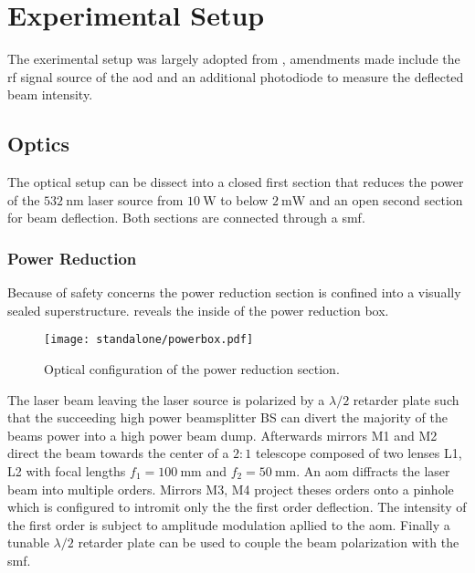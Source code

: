 \chapter{Experimental Setup}

The exerimental setup was largely adopted from \cite{Hertlein2017}, amendments
made include the \gls{rf} signal source of the \gls{aod} and an additional
photodiode to measure the deflected beam intensity.

\section{Optics}

The optical setup can be dissect into a closed first section that reduces
the power of the $\SI{532}{\nano\meter}$ laser source from $\SI{10}{\watt}$
to below $\SI{2}{\milli\watt}$ and an open second section for beam deflection.
Both sections are connected through a \gls{smf}.

\subsection{Power Reduction}
\label{sec:powerbox}

Because of safety concerns the power reduction section is confined into a
visually sealed superstructure.  reveals the inside of the
power reduction box.

\begin{figure}[h]
  \centering
  \texttt{[image: standalone/powerbox.pdf]}
  \caption{Optical configuration of the power reduction section.}
  \label{fig:powerbox}
\end{figure}

The laser beam leaving the laser source is polarized by a $\lambda/2$ retarder
plate such that the succeeding high power beamsplitter BS can divert the
majority of the beams power into a high power beam dump.
Afterwards mirrors M1 and M2 direct the beam towards the center of a $2:1$
telescope composed of two lenses L1, L2 with focal lengths
$f_1=\SI{100}{\milli\meter}$ and $f_2=\SI{50}{\milli\meter}$.
An \gls{aom} diffracts the laser beam into multiple orders. Mirrors M3, M4
project theses orders onto a pinhole which is configured to intromit only the
the first order deflection. The intensity of the first order is subject to
amplitude modulation apllied to the \gls{aom}.
Finally a tunable $\lambda/2$ retarder plate can be used to couple the beam
polarization with the \gls{smf}.

